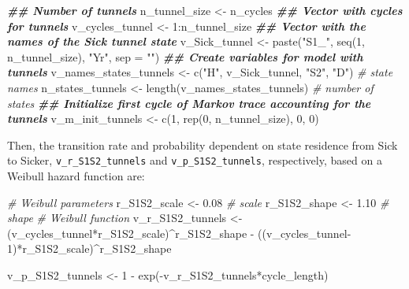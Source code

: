 \documentclass[
]{article}
\newenvironment{Shaded}{\begin{snugshade}}{\end{snugshade}}
\newcommand{\AttributeTok}[1]{\textcolor[rgb]{0.77,0.63,0.00}{#1}}
\newcommand{\CommentTok}[1]{\textcolor[rgb]{0.56,0.35,0.01}{\textit{#1}}}
\newcommand{\DecValTok}[1]{\textcolor[rgb]{0.00,0.00,0.81}{#1}}
\newcommand{\DocumentationTok}[1]{\textcolor[rgb]{0.56,0.35,0.01}{\textbf{\textit{#1}}}}
\newcommand{\FloatTok}[1]{\textcolor[rgb]{0.00,0.00,0.81}{#1}}
\newcommand{\FunctionTok}[1]{\textcolor[rgb]{0.00,0.00,0.00}{#1}}
\newcommand{\NormalTok}[1]{#1}
\newcommand{\OtherTok}[1]{\textcolor[rgb]{0.56,0.35,0.01}{#1}}
\newcommand{\SpecialCharTok}[1]{\textcolor[rgb]{0.00,0.00,0.00}{#1}}
\newcommand{\StringTok}[1]{\textcolor[rgb]{0.31,0.60,0.02}{#1}}
\begin{document}
\begin{Shaded}
\begin{Highlighting}[]
\DocumentationTok{\#\# Number of tunnels}
\NormalTok{n\_tunnel\_size }\OtherTok{\textless{}{-}}\NormalTok{ n\_cycles }
\DocumentationTok{\#\# Vector with cycles for tunnels}
\NormalTok{v\_cycles\_tunnel }\OtherTok{\textless{}{-}} \DecValTok{1}\SpecialCharTok{:}\NormalTok{n\_tunnel\_size}
\DocumentationTok{\#\# Vector with the names of the Sick tunnel state}
\NormalTok{v\_Sick\_tunnel }\OtherTok{\textless{}{-}} \FunctionTok{paste}\NormalTok{(}\StringTok{"S1\_"}\NormalTok{, }\FunctionTok{seq}\NormalTok{(}\DecValTok{1}\NormalTok{, n\_tunnel\_size), }\StringTok{"Yr"}\NormalTok{, }\AttributeTok{sep =} \StringTok{""}\NormalTok{)}
\DocumentationTok{\#\# Create variables for model with tunnels}
\NormalTok{v\_names\_states\_tunnels }\OtherTok{\textless{}{-}} \FunctionTok{c}\NormalTok{(}\StringTok{"H"}\NormalTok{, v\_Sick\_tunnel, }\StringTok{"S2"}\NormalTok{, }\StringTok{"D"}\NormalTok{) }\CommentTok{\# state names}
\NormalTok{n\_states\_tunnels }\OtherTok{\textless{}{-}} \FunctionTok{length}\NormalTok{(v\_names\_states\_tunnels)         }\CommentTok{\# number of states}
\DocumentationTok{\#\# Initialize first cycle of Markov trace accounting for the tunnels}
\NormalTok{v\_m\_init\_tunnels }\OtherTok{\textless{}{-}} \FunctionTok{c}\NormalTok{(}\DecValTok{1}\NormalTok{, }\FunctionTok{rep}\NormalTok{(}\DecValTok{0}\NormalTok{, n\_tunnel\_size), }\DecValTok{0}\NormalTok{, }\DecValTok{0}\NormalTok{) }
\end{Highlighting}
\end{Shaded}

Then, the transition rate and probability dependent on state residence from Sick to Sicker, \texttt{v\_r\_S1S2\_tunnels} and \texttt{v\_p\_S1S2\_tunnels}, respectively, based on a Weibull hazard function are:

\begin{Shaded}
\begin{Highlighting}[]
\CommentTok{\# Weibull parameters}
\NormalTok{r\_S1S2\_scale }\OtherTok{\textless{}{-}} \FloatTok{0.08} \CommentTok{\# scale}
\NormalTok{r\_S1S2\_shape }\OtherTok{\textless{}{-}} \FloatTok{1.10} \CommentTok{\# shape}
\CommentTok{\# Weibull function}
\NormalTok{v\_r\_S1S2\_tunnels }\OtherTok{\textless{}{-}}\NormalTok{ (v\_cycles\_tunnel}\SpecialCharTok{*}\NormalTok{r\_S1S2\_scale)}\SpecialCharTok{\^{}}\NormalTok{r\_S1S2\_shape }\SpecialCharTok{{-}}
\NormalTok{                    ((v\_cycles\_tunnel}\DecValTok{{-}1}\NormalTok{)}\SpecialCharTok{*}\NormalTok{r\_S1S2\_scale)}\SpecialCharTok{\^{}}\NormalTok{r\_S1S2\_shape}
                    
\NormalTok{v\_p\_S1S2\_tunnels }\OtherTok{\textless{}{-}} \DecValTok{1} \SpecialCharTok{{-}} \FunctionTok{exp}\NormalTok{(}\SpecialCharTok{{-}}\NormalTok{v\_r\_S1S2\_tunnels}\SpecialCharTok{*}\NormalTok{cycle\_length)}
\end{Highlighting}
\end{Shaded}
\end{document}
